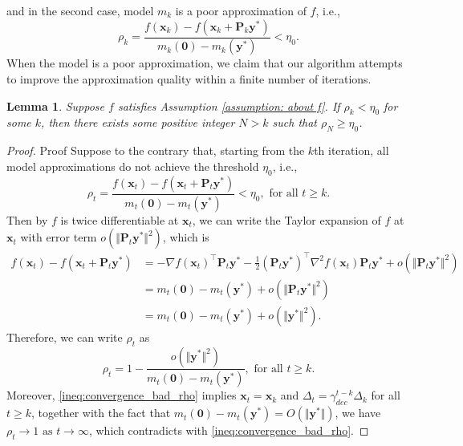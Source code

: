 \documentclass[colorlinks=true, linkcolor=blue, citecolor=blue, urlcolor=blue]{article}
\theoremstyle{plain}
\newtheorem{lemma}[theorem]{Lemma}
\theoremstyle{definition}
\theoremstyle{remark}
\begin{document}
    and in the second case, model $m_k$ is a poor approximation of $f$, i.e., 
    \begin{equation*}
        \rho_k=\frac{f(\bm{x}_k)-f(\bm{x}_k+\bm{P}_k \bm y^{*})}{m_k(\bm 0)-m_k(\bm y^*)}< \eta_0.
    \end{equation*}
    When the model is a poor approximation, we claim that our algorithm attempts to improve the approximation quality within a finite number of iterations. 
    \begin{lemma}\label{lem: convergence_bad->good}
        Suppose $f$ satisfies Assumption \ref{assumption: about f}. If $\rho_k<\eta_0$ for some $k$, then there exists some positive integer $N>k$ such that $\rho_{N}\geq\eta_0$.
    \end{lemma}
    \begin{proof}{Proof}
        Suppose to the contrary that, starting from the $k$th iteration, all model approximations do not achieve the threshold $\eta_0$, i.e.,  \begin{equation}\label{ineq:convergence_bad_rho}  \rho_t=\frac{f(\bm{x}_t)-f(\bm{x}_t+\bm{P}_t \bm y^{*})}{m_t(\bm 0)-m_t(\bm y^*)}< \eta_0,\text{ for all }t\geq k.
    \end{equation}
    Then by $f$ is twice differentiable at $\bm x_t$, we can write the Taylor expansion of $f$ at $\bm x_t$ with error term $o(\Vert \bm P_t\bm y^*\Vert^2)$, which is
    \begin{equation*}
    \begin{aligned}
        f(\bm{x}_t)-f(\bm{x}_t+\bm{P}_t \bm y^{*})
        &=-\nabla f(\bm x_t)^\top \bm P_t\bm y^*-\frac{1}{2} (\bm P_t\bm y^*)^\top\nabla^2f(\bm x_t)\bm P_t\bm y^*+o(\Vert \bm P_t\bm y^*\Vert^2)\\
        &=m_t(\bm 0)-m_t(\bm y^*)+o(\Vert \bm P_t\bm y^*\Vert^2)\\
        &=m_t(\bm 0)-m_t(\bm y^*)+o(\Vert \bm y^*\Vert^2).
    \end{aligned}   
    \end{equation*}
    Therefore, we can write $\rho_t$ as 
    \begin{equation*}
        \rho_t=1-\frac{o(\Vert\bm y^*\Vert^2)}{m_t(\bm 0)-m_t(\bm y^*)},\text{ for all }t\geq k.
    \end{equation*}
    Moreover, \eqref{ineq:convergence_bad_rho} implies $\bm x_t=\bm x_{k}$ and $\Delta_t=\gamma_{dec}^{t-k}\Delta_{k}$ for all $t\geq k$, together with the fact that
    $m_t(\bm 0)-m_t(\bm y^*)=O(\Vert \bm y^*\Vert)$, we have $\rho_t\to 1 \text{ as }t\to\infty$, which contradicts with \eqref{ineq:convergence_bad_rho}.  
    \end{proof}
\end{document}

